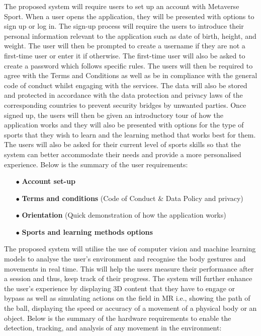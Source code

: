 \documentclass[a4paper]{article}
\begin{document}
	The proposed system will require users to set up an account with Metaverse Sport. When a user opens the application, they will be presented with options to sign up or log in. The sign-up process will require the users to introduce their personal information relevant to the application such as date of birth, height, and weight. The user will then be prompted to create a username if they are not a first-time user or enter it if otherwise. The first-time user will also be asked to create a password which follows specific rules. The users will then be required to agree with the Terms and Conditions as well as be in compliance with the general code of conduct whilst engaging with the services. The data will also be stored and protected in accordance with the data protection and privacy laws of the corresponding countries to prevent security bridges by unwanted parties.  Once signed up, the users will then be given an introductory tour of how the application works and they will also be presented with options for the type of sports that they wish to learn and the learning method that works best for them. The users will also be asked for their current level of sports skills so that the system can better accommodate their needs and provide a more personalised experience. Below is the summary of the user requirements:
	\begin{itemize}[itemindent=1em]
		\item[$\bullet$] \textbf{Account set-up}
		\item[$\bullet$] \textbf{Terms and conditions} (Code of Conduct \& Data Policy and privacy)
		\item[$\bullet$] \textbf{Orientation} (Quick demonstration of how the application works)
		\item[$\bullet$] \textbf{Sports and learning methods options}
	\end{itemize}\par
	The proposed system will utilise the use of computer vision and machine learning models to analyse the user's environment and recognise the body gestures and movements in real time. This will help the users measure their performance after a session and thus, keep track of their progress. The system will further enhance the user's experience by displaying 3D content that they have to engage or bypass as well as simulating actions on the field in MR i.e., showing the path of the ball, displaying the speed or accuracy of a movement of a physical body or an object. Below is the summary of the hardware requirements to enable the detection, tracking, and analysis of any movement in the environment:
\end{document}
